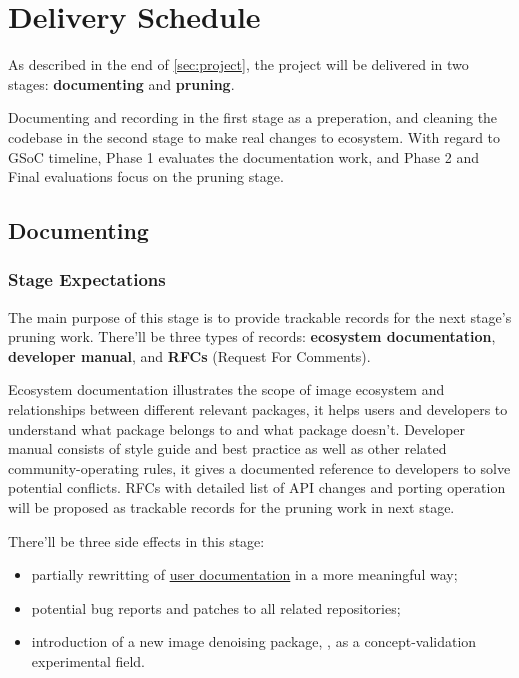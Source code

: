 
\section{Delivery Schedule}\label{sec:delivery}

As described in the end of \cref{sec:project}, the project will be delivered in two stages: \textbf{documenting} and \textbf{pruning}.

Documenting and recording in the first stage as a preperation, and cleaning the codebase in the second stage to make real changes to \images{} ecosystem. With regard to GSoC timeline, \textsf{Phase 1} evaluates the documentation work, and \textsf{Phase 2} and \textsf{Final} evaluations focus on the pruning stage.

\subsection{Documenting}\label{subsec:documentation}

\subsubsection*{Stage Expectations}

The main purpose of this stage is to provide trackable records for the next stage's pruning work. There'll be three types of records: \textbf{ecosystem documentation}, \textbf{developer manual}, and \textbf{RFCs} (Request For Comments). \par

Ecosystem documentation illustrates the scope of image ecosystem and relationships between different relevant packages, it helps users and developers to understand what package belongs to \images{} and what package doesn't. Developer manual consists of style guide and best practice as well as other related community-operating rules, it gives a documented reference to developers to solve potential conflicts. RFCs with detailed list of API changes and porting operation will be proposed as trackable records for the pruning work in next stage. \par

There'll be three side effects in this stage:

\begin{itemize}
    \item partially rewritting of \href{https://juliaimages.org}{user documentation} in a more meaningful way;
    \item potential bug reports and patches to all related \langjulia repositories;
    \item introduction of a new image denoising package, \repoimagenoise, as a concept-validation experimental field.
\end{itemize}

